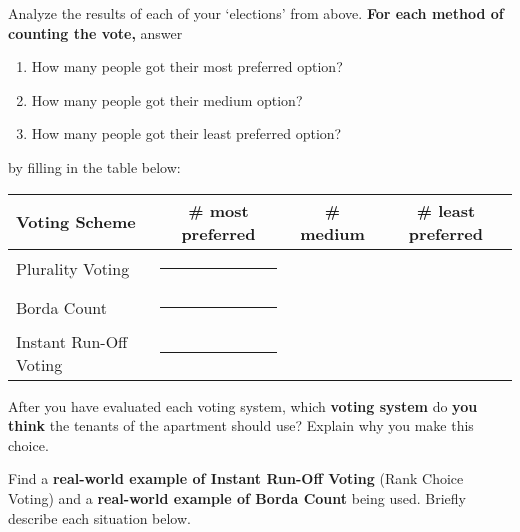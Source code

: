 \documentclass[nooutcomes,noauthor,hints,handout,12pt]{ximera}
\begin{document}
\begin{question}
  Analyze the results of each of your `elections' from above. \textbf{For each
  method of counting the vote,} answer
  \begin{enumerate}
  \item How many people got their most preferred option?
  \item How many people got their medium option? 
  \item How many people got their least preferred option?
  \end{enumerate}
  by filling in the table below:
  \begin{center}\renewcommand{\arraystretch}{1.5}
    \begin{tabular}{|l||c|c|c|}\hline
      Voting Scheme & \# most preferred & \# medium & \# least preferred \\ \hline\hline
      Plurality  Voting &  \rule[7mm]{10mm}{0mm}& & \\ \hline
      Borda Count &  \rule[7mm]{10mm}{0mm}&  & \\ \hline
      Instant Run-Off Voting & \rule[7mm]{10mm}{0mm}&  &\\\hline
    \end{tabular}
  \end{center}
  
  After you have evaluated each voting system, which \textbf{voting system} do
  \textbf{you think} the tenants of the apartment should use? Explain why you make this choice. 
\end{question}
\mynewpage








\begin{question}
  Find a \textbf{real-world example of Instant Run-Off Voting} (Rank Choice Voting) and a
  \textbf{real-world example of Borda Count} being used. Briefly
  describe each situation below.
    
\end{question}
\end{document}

